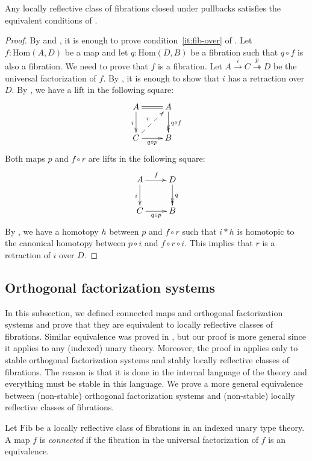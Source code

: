 \documentclass[reqno]{amsart}
\theoremstyle{definition}
\theoremstyle{remark}
\newcommand{\fs}[1]{\mathrm{#1}}
\newcommand{\Hom}{\fs{Hom}}
\newcommand{\Fib}{\fs{Fib}}
\numberwithin{figure}{section}
\begin{document}
\begin{prop}
Any locally reflective class of fibrations closed under pullbacks satisfies the equivalent conditions of .
\end{prop}
\begin{proof}
By  and , it is enough to prove condition~\eqref{it:fib-over} of .
Let $f : \Hom(A,D)$ be a map and let $q : \Hom(D,B)$ be a fibration such that $q \circ f$ is also a fibration.
We need to prove that $f$ is a fibration.
Let $A \xrightarrow{i} C \overset{p}\twoheadrightarrow D$ be the universal factorization of $f$.
By , it is enough to show that $i$ has a retraction over $D$.
By , we have a lift in the following square:
\[ \xymatrix{ A \ar@{=}[r] \ar[d]_i                 & A \ar@{->>}[d]^{q \circ f} \\
              C \ar[r]_{q \circ p} \ar@{-->}[ur]^r  & B
            } \]
Both maps $p$ and $f \circ r$ are lifts in the following square:
\[ \xymatrix{ A \ar[r]^f \ar[d]_i   & D \ar@{->>}[d]^q \\
              C \ar[r]_{q \circ p}  & B
            } \]
By , we have a homotopy $h$ between $p$ and $f \circ r$ such that $i * h$ is homotopic to the canonical homotopy between $p \circ i$ and $f \circ r \circ i$.
This implies that $r$ is a retraction of $i$ over $D$.
\end{proof}

\subsection{Orthogonal factorization systems}

In this subsection, we defined connected maps and orthogonal factorization systems and prove that they are equivalent to locally reflective classes of fibrations.
Similar equivalence was proved in \cite{modality-hott}, but our proof is more general since it applies to any (indexed) unary theory.
Moreover, the proof in \cite{modality-hott} applies only to stable orthogonal factorization systems and stably locally reflective classes of fibrations.
The reason is that it is done in the internal language of the theory and everything must be stable in this language.
We prove a more general equivalence between (non-stable) orthogonal factorization systems and (non-stable) locally reflective classes of fibrations.

\begin{defn}
Let $\Fib$ be a locally reflective class of fibrations in an indexed unary type theory.
A map $f$ is \emph{connected} if the fibration in the universal factorization of $f$ is an equivalence.
\end{defn}
\end{document}
